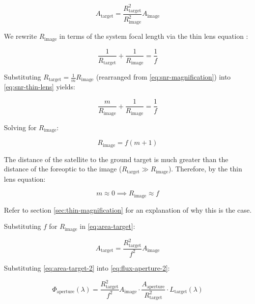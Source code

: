 \documentclass{article}
\begin{document}
\begin{equation} \label{eq:area-target}
    A_{\text{target}} = \frac{ R_{\text{target}}^2}{R_{\text{image}}^2} A_{\text{image}}
\end{equation}

We rewrite $R_{\text{image}}$ in terms of the system focal length via the thin lens equation \cite{Fiete2001-kz}:

\begin{equation} \label{eq:snr-thin-lens}
    \frac{1}{R_{\text{target}}} + \frac{1}{R_{\text{image}}} = \frac{1}{f}
\end{equation}

Substituting $R_{\text{target}} = \frac{1}{m}R_{\text{image}}$ (rearranged from \eqref{eq:snr-magnification}) into \eqref{eq:snr-thin-lens} yields:

\begin{equation}
    \frac{m}{R_{\text{image}}} + \frac{1}{R_{\text{image}}} = \frac{1}{f}
\end{equation}

Solving for $R_{\text{image}}$:

\begin{equation}
    R_{\text{image}} = f(m+1)
\end{equation}

The distance of the satellite to the ground target is much greater than the distance of the foreoptic to the image ($R_{\text{target}} \gg R_{\text{image}}$). Therefore, by the thin lens equation:

\begin{equation}
    m \approx 0 \implies R_{\text{image}} \approx f
\end{equation}

Refer to section \ref{sec:thin-magnification} for an explanation of why this is the case.

Substituting $f$ for $R_{\text{image}}$ in \eqref{eq:area-target}:

\begin{equation} \label{eq:area-target-2}
    A_{\text{target}} = \frac{ R_{\text{target}}^2}{f^2} A_{\text{image}}
\end{equation}

Substituting \eqref{eq:area-target-2} into \eqref{eq:flux-aperture-2}:

\begin{equation}
    \Phi_{\text{aperture}}(\lambda) = \frac{R_{\text{target}}^2}{f^2} A_{\text{image}} \cdot \frac{A_{\text{aperture}}}{R_{\text{target}}^2} \cdot L_{\text{target}}(\lambda)
\end{equation}
\end{document}
